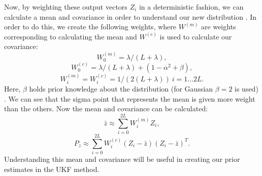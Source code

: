     Now, by weighting these output vectors $Z_i$ in a deterministic fashion, we can calculate a mean and covariance in order to understand our new distribution \cite{VanMereChapter}. In order to do this, we create the following weights, where $W^{(m)}$ are weights corresponding to calculating the mean and $W^{(c)}$ is used to calculate our covariance:
    \begin{equation} \label{eq:Weights_1}
    W_0^{(m)} = \lambda/(L + \lambda),
    \end{equation}
    \begin{equation} \label{eq:Weights_2}
    W_0^{(c)} = \lambda/(L + \lambda) + (1 - \alpha^2 + \beta),
    \end{equation}
    \begin{equation} \label{eq:Weights_3}
    W_i^{(m)} = W_i^{(c)} = 1/(2(L + \lambda)) \ i = 1 ... 2L.
    \end{equation}
    Here, $\beta$ holds prior knowledge about the distribution (for Gaussian $\beta = 2$ is used) \cite{VanMereChapter}. We can see that the sigma point that represents the mean is given more weight than the others. Now the mean and covariance can be calculated:
    \begin{equation}
     \bar{z} \approx \sum_{i = 0}^{2L} W_i^{(m)} Z_i,
    \end{equation}
    \begin{equation}
    P_z \approx \sum_{i = 0}^{2L} W_i^{(c)}(Z_i - \bar{z})(Z_i - \bar{z})^T.    
    \end{equation}
    Understanding this mean and covariance will be useful in creating our prior estimates in the UKF method.
    \\
    
